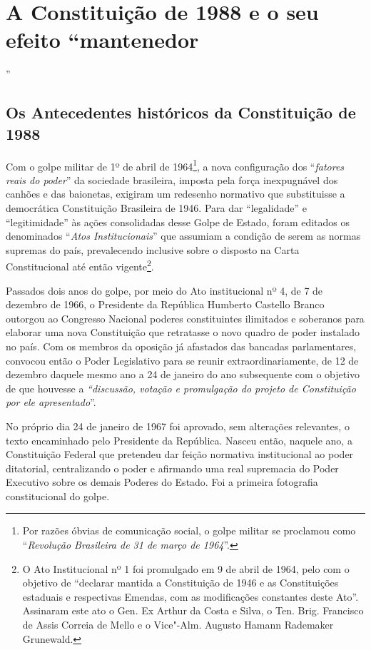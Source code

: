 \section{A Constituição de 1988 e o seu efeito
``mantenedor}''

\subsection{Os Antecedentes históricos da Constituição de 1988}

Com o golpe militar de 1º de abril de 1964\footnote{Por razões óbvias de
  comunicação social, o golpe militar se proclamou como
  ``\emph{Revolução Brasileira de 31 de março de 1964}''.}, a nova
configuração dos ``\emph{fatores reais do poder}'' da sociedade
brasileira, imposta pela força inexpugnável dos canhões e das baionetas,
exigiram um redesenho normativo que substituisse a democrática
Constituição Brasileira de 1946. Para dar ``legalidade'' e
``legitimidade'' às ações consolidadas desse Golpe de Estado, foram
editados os denominados ``\emph{Atos Institucionais}'' que assumiam a
condição de serem as normas supremas do país, prevalecendo inclusive
sobre o disposto na Carta Constitucional até então vigente\footnote{O
  Ato Institucional nº 1 foi promulgado em 9 de abril de 1964, pelo com
  o objetivo de ``declarar mantida a Constituição de 1946 e as
  Constituições estaduais e respectivas Emendas, com as modificações
  constantes deste Ato''. Assinaram este ato o Gen. Ex Arthur da Costa e
  Silva, o Ten. Brig. Francisco de Assis Correia de Mello e o Vice"-Alm.
  Augusto Hamann Rademaker Grunewald.}.

Passados dois anos do golpe, por meio do Ato institucional nº 4, de 7 de
dezembro de 1966, o Presidente da República Humberto Castello Branco
outorgou ao Congresso Nacional poderes constituintes ilimitados e
soberanos para elaborar uma nova Constituição que retratasse o novo
quadro de poder instalado no país. Com os membros da oposição já
afastados das bancadas parlamentares, convocou então o Poder Legislativo
para se reunir extraordinariamente, de 12 de dezembro daquele mesmo ano
a 24 de janeiro do ano subsequente com o objetivo de que houvesse a
\emph{``discussão, votação e promulgação do projeto de Constituição por
ele apresentado}''.

No próprio dia 24 de janeiro de 1967 foi aprovado, sem alterações
relevantes, o texto encaminhado pelo Presidente da República. Nasceu
então, naquele ano, a Constituição Federal que pretendeu dar feição
normativa institucional ao poder ditatorial, centralizando o poder e
afirmando uma real supremacia do Poder Executivo sobre os demais Poderes
do Estado. Foi a primeira fotografia constitucional do golpe.

